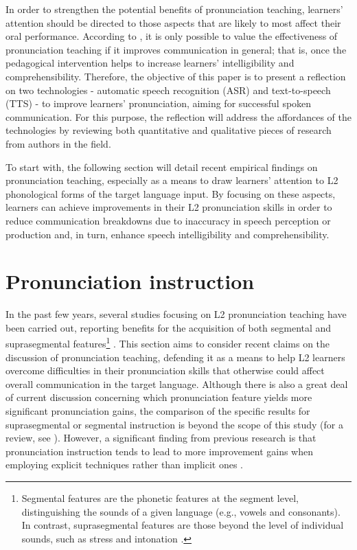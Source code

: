 \documentclass[english]{textolivre}
\begin{document}
In order to strengthen the potential benefits of pronunciation teaching, learners’ attention should be directed to those aspects that are likely to most affect their oral performance. According to \textcite{derwing2018}, it is only possible to value the effectiveness of pronunciation teaching if it improves communication in general; that is, once the pedagogical intervention helps to increase learners’ intelligibility and comprehensibility. Therefore, the objective of this paper is to present a reflection on two technologies - automatic speech recognition (ASR) and text-to-speech (TTS) - to improve learners’ pronunciation, aiming for successful spoken communication. For this purpose, the reflection will address the affordances of the technologies by reviewing both quantitative and qualitative pieces of research from authors in the field.

To start with, the following section will detail recent empirical findings on pronunciation teaching, especially as a means to draw learners’ attention to L2 phonological forms of the target language input. By focusing on these aspects, learners can achieve improvements in their L2 pronunciation skills in order to reduce communication breakdowns due to inaccuracy in speech perception or production and, in turn, enhance speech intelligibility and comprehensibility.

\section{Pronunciation instruction}\label{sec-2}
In the past few years, several studies focusing on L2 pronunciation teaching have been carried out, reporting benefits for the acquisition of both segmental and suprasegmental features\footnote{Segmental features are the phonetic features at the segment level, distinguishing the sounds of a given language (e.g., vowels and consonants). In contrast, suprasegmental features are those beyond the level of individual sounds, such as stress and intonation \cite{yavas2011}.} \cite{thomson2015}. This section aims to consider recent claims on the discussion of pronunciation teaching, defending it as a means to help L2 learners overcome difficulties in their pronunciation skills that otherwise could affect overall communication in the target language. Although there is also a great deal of current discussion concerning which pronunciation feature yields more significant pronunciation gains, the comparison of the specific results for suprasegmental or segmental instruction is beyond the scope of this study (for a review, see \textcite{gordon2016, lee2020, zhang2020}). However, a significant finding from previous research is that pronunciation instruction tends to lead to more improvement gains when employing explicit techniques rather than implicit ones \cite{thomson2015, gordon2016}.
\end{document}

